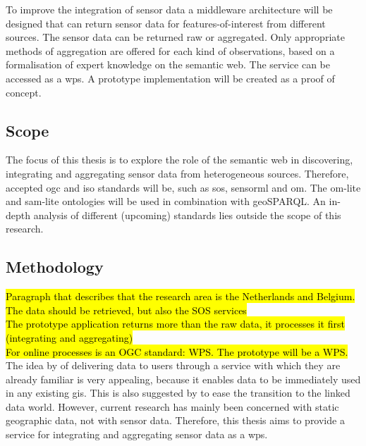 To improve the integration of sensor data a middleware architecture will be designed that can return sensor data for features-of-interest from different sources. The sensor data can be returned raw or aggregated. Only appropriate methods of aggregation are offered for each kind of observations, based on a formalisation of expert knowledge on the semantic web. The service can be accessed as a \ac{wps}. A prototype implementation will be created as a proof of concept.

\subsection{Scope}
The focus of this thesis is to explore the role of the semantic web in discovering, integrating and aggregating sensor data from heterogeneous sources. Therefore, accepted \ac{ogc} and \ac{iso} standards will be, such as \ac{sos}, \ac{sensorml} and \ac{om}. The om-lite and sam-lite ontologies will be used in combination with geoSPARQL. An in-depth analysis of different (upcoming) standards lies outside the scope of this research. 


\subsection{Methodology}

\hl{Paragraph that describes that the research area is the Netherlands and Belgium.}\\
\hl{The data should be retrieved, but also the SOS services}\\
\hl{The prototype application returns more than the raw data, it processes it first (integrating and aggregating) }\\
\hl{For online processes is an OGC standard: WPS. The prototype will be a WPS.}\\

The idea by \cite{SW:Jones} of delivering data to users through a service with which they are already familiar is very appealing, because it enables data to be immediately used in any existing \ac{gis}. This is also suggested by \cite{SSW:Atkinson} to ease the transition to the linked data world. However, current research has mainly been concerned with static geographic data, not with sensor data. Therefore, this thesis aims to provide a service for integrating and aggregating sensor data as a \ac{wps}.



